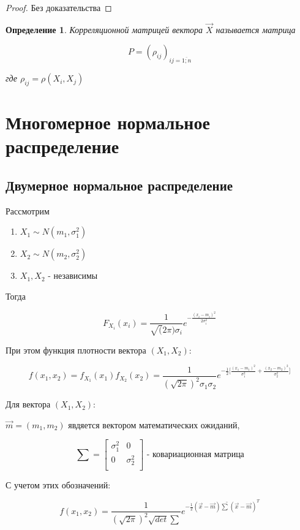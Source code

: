 \documentclass[a4paper, 14pt]{report}
\newtheorem{defenition}{Определение}[section]
\begin{document}
\begin{proof}
    Без доказательства
\end{proof}

\begin{defenition}
    Корреляционной матрицей вектора $\vec X$ называется матрица

    $$
    P = (\rho_{ij})_{ij = \overline{1;n}}
    $$

    где $\rho_{ij} = \rho(X_i, X_j)$
\end{defenition}

\section{Многомерное нормальное распределение}

\subsection{Двумерное нормальное распределение}

Рассмотрим

\begin{enumerate}
    \item $X_1 \sim N(m_1, \sigma_1^2)$
    \item $X_2 \sim N(m_2, \sigma_2^2)$
    \item $X_1, X_2$ - независимы
\end{enumerate}

Тогда

$$
F_{X_i} (x_i) = \frac{1}{\sqrt(2\pi)\sigma_i} e^{-\frac{(x_i-m_i)^2}{2 \sigma_i^2}}
$$

При этом функция плотности вектора $(X_1, X_2)$:

$$
f(x_1, x_2) = f_{X_1}(x_1)f_{X_2}(x_2) = \frac{1}{(\sqrt{2\pi})^2 \sigma_1 \sigma_2} e^{-\frac{1}{2} \big[ \frac{(x_1-m_1)^2}{\sigma_1^2} + \frac{(x_2-m_2)^2}{\sigma_2^2} \big]}
$$

Для вектора $(X_1,X_2)$:

$\vec m = (m_1, m_2)$ явдяется вектором математических ожиданий,

$$
\sum =
\left[
    \begin{matrix}
        \sigma_1^2 & 0 \\
        0 & \sigma_2^2 \\
    \end{matrix}
\right]
\text{ - ковариационная матрица}
$$

С учетом этих обозначений:

$$
f(x_1, x_2) = \frac{1}{(\sqrt{2\pi})^2 \sqrt{det} \sum} e^{-\frac{1}{2} (\vec x - \vec m) \tilde \sum (\vec x - \vec m)^T}
$$
\end{document}
